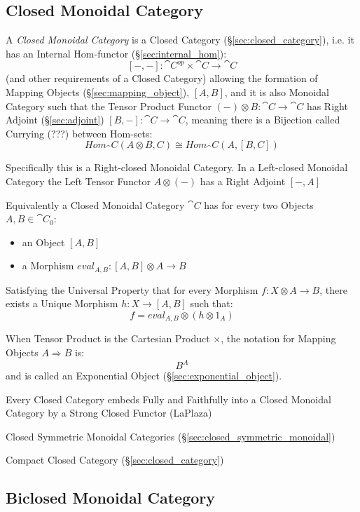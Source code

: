 \subsection{Closed Monoidal Category}\label{sec:closed_monoidal}

A \emph{Closed Monoidal Category} is a Closed Category
(\S\ref{sec:closed_category}), i.e. it has an Internal Hom-functor
(\S\ref{sec:internal_hom}):
\[
  [-,-] : \cat{C}^{op} \times \cat{C} \rightarrow \cat{C}
\]
(and other requirements of a Closed Category) allowing the formation
of Mapping Objects (\S\ref{sec:mapping_object}), $[A,B]$,
and it is also Monoidal Category such that the Tensor Product Functor
$(-) \otimes B : \cat{C} \rightarrow \cat{C}$ has Right Adjoint
(\S\ref{sec:adjoint}) $[B,-] : \cat{C} \rightarrow \cat{C}$,
meaning there is a Bijection called Currying (???) between Hom-sets:
\[
  Hom_\cat{C}(A \otimes B,C) \cong Hom_\cat{C}(A, [B,C])
\]

Specifically this is a Right-closed Monoidal Category. In a
Left-closed Monoidal Category the Left Tensor Functor $A \otimes (-)$
has a Right Adjoint $[-,A]$

Equivalently a Closed Monoidal Category $\cat{C}$ has for every two
Objects $A,B \in \cat{C}_0$:
\begin{itemize}
  \item an Object $[A,B]$
  \item a Morphism $eval_{A,B} : [A,B] \otimes A \rightarrow B$
\end{itemize}
Satisfying the Universal Property that for every Morphism $f : X
\otimes A \rightarrow B$, there exists a Unique Morphism $h : X
\rightarrow [A,B]$ such that:
\[
  f = eval_{A,B} \otimes (h \otimes 1_A)
\]

When Tensor Product is the Cartesian Product $\times$, the notation
for Mapping Objects $A \Rightarrow B$ is:
\[
  B^A
\]
and is called an Exponential Object (\S\ref{sec:exponential_object}).

Every Closed Category embeds Fully and Faithfully into a Closed
Monoidal Category by a Strong Closed Functor (LaPlaza)

Closed Symmetric Monoidal Categories
(\S\ref{sec:closed_symmetric_monoidal})

Compact Closed Category (\S\ref{sec:closed_category})



\subsection{Biclosed Monoidal Category}\label{sec:biclosed_monoidal}

